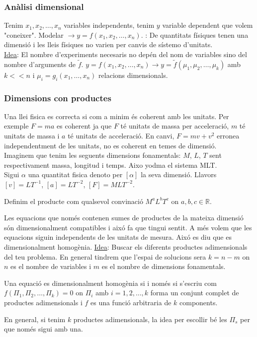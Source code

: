 \documentclass[../main.tex]{subfiles}
\begin{document}
\subsubsection{Anàlisi dimensional}
Tenim $x_1, x_2, \dots, x_n$ variables independents, tenim $y$ variable dependent que volem "coneixer". Modelar $\rightarrow y = f(x_1, x_2, \dots, x_n)$. : De quantitats físiques tenen una dimensió i les lleis físiques no varien per canvis de sístemo d'unitats.\\
\underline{Idea}: El nombre d'experiments necesaris no depén del nom de variables sino del nombre d'arguments de $\tilde{f}$. $y = f(x_1, x_2, \dots, x_n) \rightarrow y = \tilde{f}(\mu_1, \mu_2, \dots, \mu_k)$ amb $k << n$ i $\mu_i = g_i(x_1,\dots,x_n)$ relacions dimensionals.
\subsubsection{Dimensions con productes}
Una llei fisica es correcta si com a minim és coherent amb les unitats. Per exemple $F = ma$ es coherent ja que $F$ té unitats de massa per acceleració, $m$ té unitats de massa i $a$ té unitats de acceleració. En canvi, $F = mv + v^2$ erronea independentment de les unitats, no es coherent en temes de dimensió.\\
Imaginem que tenim les seguents dimensions fonamentals: $M$, $L$, $T$ sent respectivament massa, longitud i temps. Aixo yodma el sistema MLT.\\
Sigui $\alpha$ una quantitat fisica denoto per $[\alpha]$ la seva dimensió. Llavors $[v] = LT^{-1}$, $[a] = LT^{-2}$, $[F] = MLT^{-2}$.\\
\begin{definicio}
    Definim el producte com qualsevol convinació $M^aL^bT^c$ on $a, b, c \in \mathbb{R}$.
\end{definicio}
Les equacions que només contenen sumes de productes de la mateixa dimensió són dimensionalment compatibles i aixó fa que tingui sentit.
A més volem que les equacions siguin independents de les unitats de mesura. Aixó es diu que es dimensionalment homogènia.
\underline{Idea}: Buscar els diferents productes adimensionals del teu problema.
En general tindrem que l'espai de solucions sera $k = n - m$ on $n$ es el nombre de variables i $m$ es el nombre de dimensions fonamentals.
\begin{teorema}[de Buckingham]
    Una equació es dimensionalment homogènia si i només si s'escriu com $f(\Pi_1, \Pi_2, \dots, \Pi_k) = 0$ on $\Pi_i$ amb $i = 1, 2, \dots, k$ forma un conjunt complet de productes adimensionals i $f$ es una funció arbitraria de $k$ components.
\end{teorema}
En general, si tenim $k$ productes adimensionals, la idea per escollir bé les $\Pi_s$ per que només sigui amb una.
\end{document}
